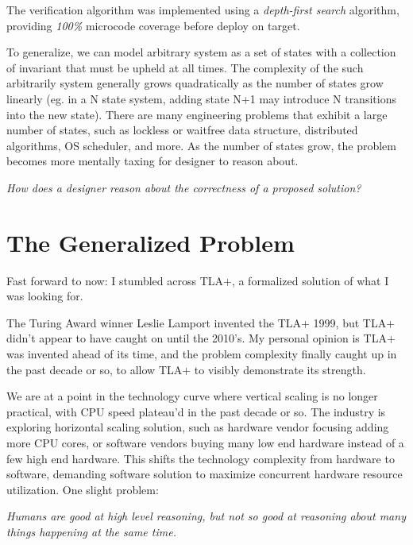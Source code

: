 The verification algorithm was implemented using a \textit{depth-first search}
algorithm, providing \textit{100\%} microcode coverage before deploy on
target.\newline

To generalize, we can model arbitrary system as a set of states with a
collection of invariant that must be upheld at all times. The complexity of the
such arbitrarily system generally grows quadratically as the number of states
grow linearly (eg. in a N state system, adding state N+1 may introduce N
transitions into the new state). There are many engineering problems that
exhibit a large number of states, such as lockless or waitfree data structure,
distributed algorithms, OS scheduler, and more. As the number of states grow, 
the problem becomes more mentally taxing for designer to reason about.\newline

\textit{How does a designer reason about the correctness of a proposed
solution?}

\section{The Generalized Problem}

Fast forward to now: I stumbled across TLA+, a formalized solution of what I was
looking for.\newline

The Turing Award winner Leslie Lamport invented the TLA+ 1999, but TLA+ didn't
appear to have caught on until the 2010's. My personal opinion is TLA+ was
invented ahead of its time, and the problem complexity finally caught up in the
past decade or so, to allow TLA+ to visibly demonstrate its strength.\newline

We are at a point in the technology curve where vertical scaling is no longer
practical, with CPU speed plateau'd in the past decade or so. The industry is
exploring horizontal scaling solution, such as hardware vendor focusing adding
more CPU cores, or software vendors buying many low end hardware instead of a
few high end hardware. This shifts the technology complexity from hardware to
software, demanding software solution to maximize concurrent hardware resource
utilization. One slight problem:\newline

\textit{Humans are good at high level reasoning, but not so good at reasoning
about many things happening at the same time.}\newline

